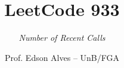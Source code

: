\title{LeetCode 933}
\subtitle{\textit{Number of Recent Calls}}
\author{Prof. Edson Alves -- UnB/FGA}
\date{}
